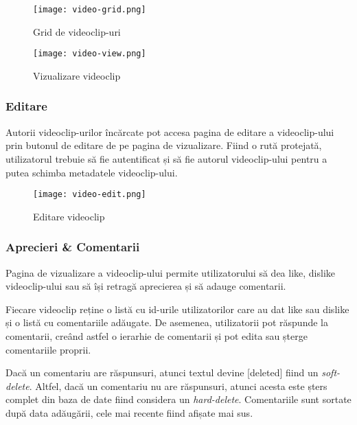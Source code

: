 \begin{figure}[h] 
    \centering
    \begin{minipage}{0.49\textwidth}
        \centering
        \texttt{[image: video-grid.png]}
        \caption{Grid de videoclip-uri}
        \label{fig:video-grid}
    \end{minipage}\hfill
    \begin{minipage}{0.49\textwidth}
        \centering
        \texttt{[image: video-view.png]}
        \caption{Vizualizare videoclip}
        \label{fig:video-view}
    \end{minipage}
\end{figure}

\subsubsection{Editare}
Autorii videoclip-urilor încărcate pot accesa pagina de editare a videoclip-ului prin butonul
de editare de pe pagina de vizualizare. Fiind o rută protejată, utilizatorul trebuie să fie
autentificat și să fie autorul videoclip-ului pentru a putea schimba metadatele videoclip-ului.

\begin{figure}[h]
    \centering
    \texttt{[image: video-edit.png]}
    \caption{Editare videoclip}
    \label{fig:video-edit}
\end{figure}

\subsubsection{Aprecieri \& Comentarii}
Pagina de vizualizare a videoclip-ului permite utilizatorului să dea like, dislike videoclip-ului
sau să își retragă aprecierea și să adauge comentarii. 
\par
Fiecare videoclip reține o listă cu id-urile utilizatorilor care au dat like sau dislike și o
listă cu comentariile adăugate. De asemenea, utilizatorii pot răspunde la comentarii, creând astfel
o ierarhie de comentarii și pot edita sau șterge comentariile proprii.
\par
Dacă un comentariu are răspunsuri, atunci textul devine [deleted] fiind un \textit{soft-delete}.
Altfel, dacă un comentariu nu are răspunsuri, atunci acesta este șters complet din baza de date
fiind considera un \textit{hard-delete}. Comentariile sunt sortate după data adăugării, cele mai
recente fiind afișate mai sus. 


